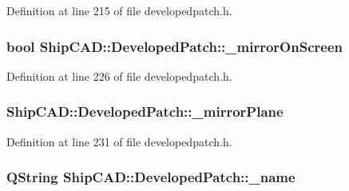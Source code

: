 Definition at line 215 of file developedpatch.\+h.

\subsubsection[{\texorpdfstring{\+\_\+mirror\+On\+Screen}{_mirrorOnScreen}}]{\setlength{\rightskip}{0pt plus 5cm}bool Ship\+C\+A\+D\+::\+Developed\+Patch\+::\+\_\+mirror\+On\+Screen\hspace{0.3cm}{\ttfamily [protected]}}\hypertarget{classShipCAD_1_1DevelopedPatch_a86574c4cb5748be1725e4a489270db1a}{}\label{classShipCAD_1_1DevelopedPatch_a86574c4cb5748be1725e4a489270db1a}


Definition at line 226 of file developedpatch.\+h.

\subsubsection[{\texorpdfstring{\+\_\+mirror\+Plane}{_mirrorPlane}}]{ Ship\+C\+A\+D\+::\+Developed\+Patch\+::\+\_\+mirror\+Plane\hspace{0.3cm}{\ttfamily [protected]}}\hypertarget{classShipCAD_1_1DevelopedPatch_a88ff1deb88a87de3e54de5169edb542a}{}\label{classShipCAD_1_1DevelopedPatch_a88ff1deb88a87de3e54de5169edb542a}


Definition at line 231 of file developedpatch.\+h.

\subsubsection[{\texorpdfstring{\+\_\+name}{_name}}]{\setlength{\rightskip}{0pt plus 5cm}Q\+String Ship\+C\+A\+D\+::\+Developed\+Patch\+::\+\_\+name\hspace{0.3cm}{\ttfamily [protected]}}\hypertarget{classShipCAD_1_1DevelopedPatch_a0af8b4e9e1ee667c781fef6df56ca7d3}{}\label{classShipCAD_1_1DevelopedPatch_a0af8b4e9e1ee667c781fef6df56ca7d3}


